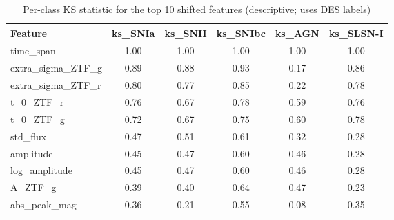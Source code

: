 \begin{table}
\centering
\caption{Per-class KS statistic for the top 10 shifted features (descriptive; uses DES labels)}
\begin{tabular}{lccccc}
\hline
Feature & ks\_SNIa & ks\_SNII & ks\_SNIbc & ks\_AGN & ks\_SLSN-I \\
\hline
time\_span & 1.00 & 1.00 & 1.00 & 1.00 & 1.00 \\
extra\_sigma\_ZTF\_g & 0.89 & 0.88 & 0.93 & 0.17 & 0.86 \\
extra\_sigma\_ZTF\_r & 0.80 & 0.77 & 0.85 & 0.22 & 0.78 \\
t\_0\_ZTF\_r & 0.76 & 0.67 & 0.78 & 0.59 & 0.76 \\
t\_0\_ZTF\_g & 0.72 & 0.67 & 0.75 & 0.60 & 0.78 \\
std\_flux & 0.47 & 0.51 & 0.61 & 0.32 & 0.28 \\
amplitude & 0.45 & 0.47 & 0.60 & 0.46 & 0.28 \\
log\_amplitude & 0.45 & 0.47 & 0.60 & 0.46 & 0.28 \\
A\_ZTF\_g & 0.39 & 0.40 & 0.64 & 0.47 & 0.23 \\
abs\_peak\_mag & 0.36 & 0.21 & 0.55 & 0.08 & 0.35 \\
\hline
\end{tabular}
\end{table}

